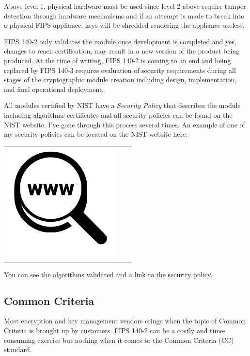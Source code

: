 Above level 1, physical hardware must be used since level 2 above require tamper detection through hardware mechanisms and if an attempt is made to break into a physical FIPS appliance, keys will be shredded rendering the appliance useless.

FIPS 140-2 only validates the module once development is completed and yes, changes to reach certification, may result in a new version of the product being produced. At the time of writing, FIPS 140-2 is coming to an end and being replaced by FIPS 140-3 requires evaluation of  security requirements during all stages of the cryptographic module creation including design, implementation, and final operational deployment.

All modules certified by NIST have a \textit{Security Policy} that describes the module including algorithms certificates and all security policies can be found on the NIST website. I've gone through this process several times. An example of one of my security policies can be located on the NIST website here:

\begin{table}[h]
\begin{tabular}{lcl}
\parbox[r]{0.5in}{\includegraphics[scale=0.15]{figures/url.png}} & \parbox[l]{0.1in}{} & \parbox[l]{3in}{}
\end{tabular}
\end{table}

\noindent
You can see the algorithms validated and a link to the security policy.

\subsection{Common Criteria}

Most encryption and key management vendors cringe when the topic of Common Criteria is brought up by customers. FIPS 140-2 can be a costly and time-consuming exercise but nothing when it comes to the Common Criteria (CC) standard.

